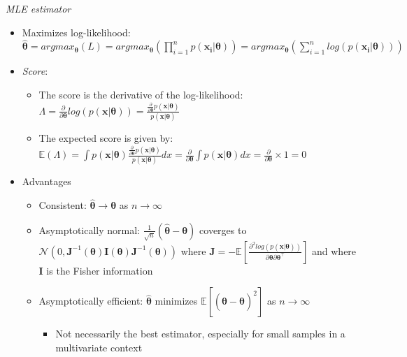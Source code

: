 \emph{MLE estimator}
\begin{itemize}
    \item Maximizes log-likelihood: $\hat{\boldsymbol{\theta}} = argmax_{\boldsymbol{\theta}}(L) = argmax_{\boldsymbol{\theta}}(\prod_{i=1}^n p(\boldsymbol{x_i} | \boldsymbol{\theta})) = argmax_{\boldsymbol{\theta}}(\sum_{i=1}^n log(p(\boldsymbol{x_i} | \boldsymbol{\theta})))$
    \item \emph{Score}: 
    \begin{itemize}
        \item The score is the derivative of the log-likelihood: $\Lambda = \frac{\partial}{\partial \boldsymbol{\theta}} log(p( \boldsymbol{x} | \boldsymbol{\theta})) = \frac{ \frac{\partial}{\partial \boldsymbol{\theta}} p( \boldsymbol{x} | \boldsymbol{\theta})}{ p( \boldsymbol{x} | \boldsymbol{\theta}) }$
        \item The expected score is given by: $\mathbb{E}(\Lambda) = \int p( \boldsymbol{x} | \boldsymbol{\theta}) \frac{ \frac{\partial}{\partial \boldsymbol{\theta}} p( \boldsymbol{x} | \boldsymbol{\theta})}{ p( \boldsymbol{x} | \boldsymbol{\theta}) } dx = \frac{\partial}{\partial \boldsymbol{\theta}} \int p( \boldsymbol{x} | \boldsymbol{\theta}) dx = \frac{\partial}{\partial \boldsymbol{\theta}} \times 1 = 0$
    \end{itemize}
    \item Advantages
    \begin{itemize}
        \item Consistent: $\hat{\boldsymbol{\theta}} \rightarrow \boldsymbol{\theta}$ as $n \rightarrow \infty$
        \item Asymptotically normal: $\frac{1}{\sqrt{n}} (\hat{\boldsymbol{\theta}} - \boldsymbol{\theta})$ coverges to $\mathcal{N}(0 , \boldsymbol{J}^{-1} (\boldsymbol{\theta}) \boldsymbol{I}(\boldsymbol{\theta}) \boldsymbol{J}^{-1} (\boldsymbol{\theta}) )$ where $\boldsymbol{J} = -\mathbb{E}[ \frac{ \partial^2 log( p(\boldsymbol{x} | \boldsymbol{\theta}) ) }{ \partial \boldsymbol{\theta} \partial \boldsymbol{\theta}^\intercal } ]$ and where $\boldsymbol{I}$ is the Fisher information
        \item Asymptotically efficient: $\hat{\boldsymbol{\theta}}$ minimizes $\mathbb{E} [ ( \hat{\boldsymbol{\theta}} - \boldsymbol{\theta} )^2 ]$ as $n \rightarrow \infty$ 
        \begin{itemize}
            \item Not necessarily the best estimator, especially for small samples in a multivariate context

\end{itemize}
\end{itemize}
\end{itemize}

